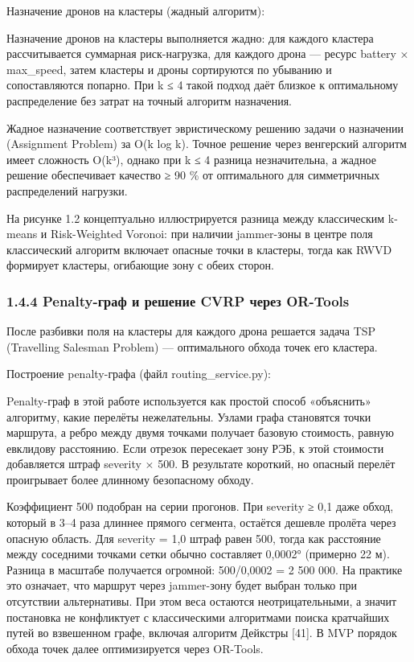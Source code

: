 \documentclass[14pt,a4paper]{extarticle}
\begin{document}
Назначение дронов на кластеры (жадный алгоритм):

Назначение дронов на кластеры выполняется жадно: для каждого кластера рассчитывается суммарная риск-нагрузка, для каждого дрона — ресурс battery × max_speed, затем кластеры и дроны сортируются по убыванию и сопоставляются попарно. При k ≤ 4 такой подход даёт близкое к оптимальному распределение без затрат на точный алгоритм назначения.


Жадное назначение соответствует эвристическому решению задачи о назначении (Assignment Problem) за O(k log k). Точное решение через венгерский алгоритм имеет сложность O(k³), однако при k ≤ 4 разница незначительна, а жадное решение обеспечивает качество ≥ 90 \% от оптимального для симметричных распределений нагрузки.

На рисунке 1.2 концептуально иллюстрируется разница между классическим k-means и Risk-Weighted Voronoi: при наличии jammer-зоны в центре поля классический алгоритм включает опасные точки в кластеры, тогда как RWVD формирует кластеры, огибающие зону с обеих сторон.

\hypertarget{penalty-ux433ux440ux430ux444-ux438-ux440ux435ux448ux435ux43dux438ux435-cvrp-ux447ux435ux440ux435ux437-or-tools}{%
\subsubsection{1.4.4 Penalty-граф и решение CVRP через OR-Tools}\label{penalty-ux433ux440ux430ux444-ux438-ux440ux435ux448ux435ux43dux438ux435-cvrp-ux447ux435ux440ux435ux437-or-tools}}

После разбивки поля на кластеры для каждого дрона решается задача TSP (Travelling Salesman Problem) --- оптимального обхода точек его кластера.

Построение penalty-графа (файл routing\_service.py):

Penalty-граф в этой работе используется как простой способ «объяснить» алгоритму, какие перелёты нежелательны. Узлами графа становятся точки маршрута, а ребро между двумя точками получает базовую стоимость, равную евклидову расстоянию. Если отрезок пересекает зону РЭБ, к этой стоимости добавляется штраф severity × 500. В результате короткий, но опасный перелёт проигрывает более длинному безопасному обходу.


Коэффициент 500 подобран на серии прогонов. При severity ≥ 0,1 даже обход, который в 3--4 раза длиннее прямого сегмента, остаётся дешевле пролёта через опасную область. Для severity = 1,0 штраф равен 500, тогда как расстояние между соседними точками сетки обычно составляет 0,0002° (примерно 22 м). Разница в масштабе получается огромной: 500/0,0002 = 2 500 000. На практике это означает, что маршрут через jammer-зону будет выбран только при отсутствии альтернативы. При этом веса остаются неотрицательными, а значит постановка не конфликтует с классическими алгоритмами поиска кратчайших путей во взвешенном графе, включая алгоритм Дейкстры {[}41{]}. В MVP порядок обхода точек далее оптимизируется через OR-Tools.
\end{document}
